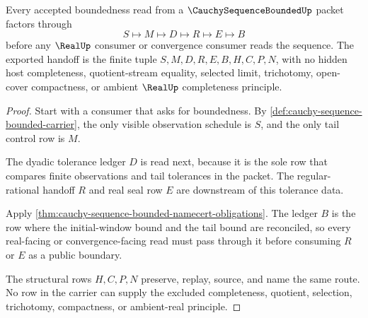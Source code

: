 \begin{theorem}
\label{thm:cauchy-sequence-bounded-window-bound-handoff}
Every accepted boundedness read from a $\CauchySequenceBoundedUp$ packet factors through
$$
S\longmapsto M\longmapsto D\longmapsto R\longmapsto E\longmapsto B
$$
before any $\RealUp$ consumer or convergence consumer reads the sequence. The exported handoff is the finite tuple $S,M,D,R,E,B,H,C,P,N$, with no hidden host completeness, quotient-stream equality, selected limit, trichotomy, open-cover compactness, or ambient $\RealUp$ completeness principle.
\end{theorem}
\begin{proof}
Start with a consumer that asks for boundedness. By \autoref{def:cauchy-sequence-bounded-carrier}, the only visible observation schedule is $S$, and the only tail control row is $M$.

The dyadic tolerance ledger $D$ is read next, because it is the sole row that compares finite observations and tail tolerances in the packet. The regular-rational handoff $R$ and real seal row $E$ are downstream of this tolerance data.

Apply \autoref{thm:cauchy-sequence-bounded-namecert-obligations}. The ledger $B$ is the row where the initial-window bound and the tail bound are reconciled, so every real-facing or convergence-facing read must pass through it before consuming $R$ or $E$ as a public boundary.

The structural rows $H,C,P,N$ preserve, replay, source, and name the same route. No row in the carrier can supply the excluded completeness, quotient, selection, trichotomy, compactness, or ambient-real principle.
\end{proof}

